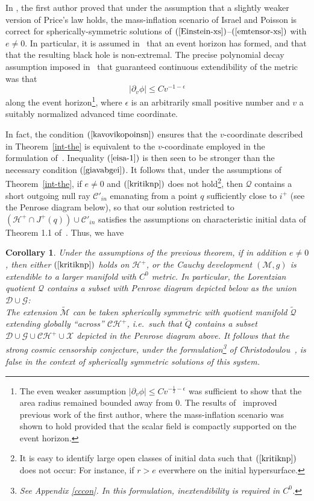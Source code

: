 \documentclass{article}
\newtheorem{corollary}{Corollary}[theorem]
\begin{document}
In \cite{md:cbh}, the first author proved that under the assumption that
a slightly weaker version of Price's law holds, the mass-inflation 
scenario of Israel and Poisson is correct
for spherically-symmetric solutions of $(\ref{Einstein-xs})$--$(\ref{emtensor-xs})$
with $e\ne0$.
In particular, it is assumed in~\cite{md:cbh} that an event horizon
has formed, and that that the resulting black hole is non-extremal.
The precise polynomial decay assumption imposed in~\cite{md:cbh}
that guaranteed continuous extendibility
of the metric was that
\begin{equation}
\label{giavabgei}
|\partial_v\phi|\le Cv^{-1-\epsilon}
\end{equation}
along the event horizon\footnote{The even weaker assumption
$|\partial_v\phi|\le Cv^{-\frac12-\epsilon}$ was sufficient to show that the area
radius remained bounded away from $0$. The results of~\cite{md:cbh} improved
previous work \cite{md:si} of the first
author, where the mass-inflation scenario was shown to hold provided
that the scalar field is compactly supported on the event horizon.}, 
where $\epsilon$
is an arbitrarily small positive number and $v$ a suitably normalized
advanced time coordinate.

In fact, the condition $(\ref{kavovikopoinsn})$ ensures
that the $v$-coordinate described in Theorem~\ref{int-the}
is equivalent to the $v$-coordinate
employed in the formulation of~\cite{md:cbh}. Inequality
$(\ref{eisa-1})$ is then seen to be stronger than the necessary condition
$(\ref{giavabgei})$.
It follows that, under the assumptions of Theorem~\ref{int-the}, 
if $e\neq0$ and $(\ref{kritiknp})$ does not 
hold\footnote{
It is easy to identify large open classes of initial data such that
$(\ref{kritiknp})$ does not occur: For instance, if $r>e$ 
everwhere on the initial hypersurface.},
then $\mathcal{Q}$ contains 
a short outgoing null ray $\mathcal{C}'_{in}$ emanating
from a point $q$ sufficiently close to $i^+$ (see the Penrose
diagram below), so that
our solution restricted to
$(\mathcal{H}^+\cap J^+(q))\cup\mathcal{C}'_{in}$  satisfies the assumptions
on characteristic initial data of Theorem 1.1 of~\cite{md:cbh}. 
Thus, we have
\begin{corollary}
\label{cor-1}
Under the assumptions of the previous theorem, if in addition $e\neq0$,
then either $(\ref{kritiknp})$ holds on $\mathcal{H}^+$,
or the Cauchy development $(\mathcal{M},g)$ is extendible 
to a larger manifold with $C^0$
metric. In particular, the Lorentzian
quotient $\mathcal{Q}$ contains
a subset with Penrose diagram depicted
below as the union $\mathcal{D}\cup\mathcal{G}$:
\[

\]
The extension $\tilde{\mathcal{M}}$ can be taken spherically symmetric
with quotient manifold $\tilde{\mathcal{Q}}$  
extending globally ``across'' $\mathcal{CH}^+$, i.e.~such that
$\tilde{Q}$ contains a subset $\mathcal{D}\cup\mathcal{G}\cup
\mathcal{CH}^+\cup\mathcal{X}$ depicted 
in the Penrose diagram above.
It follows that
the strong cosmic censorship conjecture, under the
formulation\footnote{See Appendix \ref{cccon}. In this formulation,
inextendibility is required in $C^0$.} of Christodoulou~\cite{chr:givp}, 
is \emph{false}
in the context of spherically symmetric solutions of this system.
\end{corollary}
\end{document}
